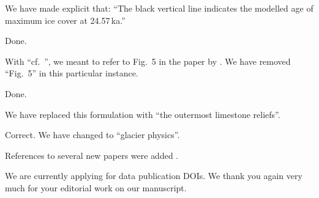     We have made explicit that: ``The black vertical line indicates the
    modelled age of maximum ice cover at 24.57\,ka.''


    Done.


    With ``cf.~\citealp[Fig.~5 for reviews]{Ivy-Ochs.2015, Wirsig.etal.2016}'',
    we meant to refer to Fig.~5 in the paper by \citep{Wirsig.etal.2016}. We
    have removed ``Fig.~5'' in this particular instance.


    Done.


    We have replaced this formulation with ``the outermost limestone reliefs''.


    Correct. We have changed to ``glacier physics''.




    References to several new papers were added \citep{Cohen.etal.2018,
    Gild.etal.2018, Ivy-Ochs.etal.2018, Barrett.etal.2018, Spotl.etal.2018}.

    We are currently applying for data publication DOIs.
    We thank you again very much for your editorial work on our manuscript.







